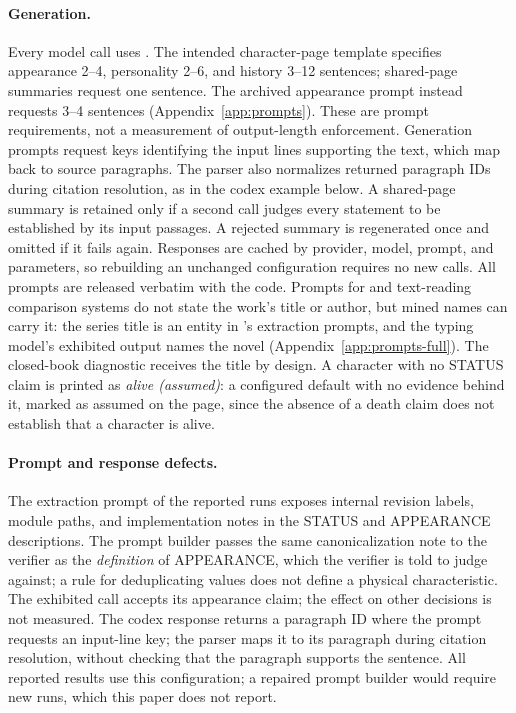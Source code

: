 \paragraph{Generation.} Every model call uses . The intended character-page
template specifies appearance 2--4, personality 2--6, and history 3--12 sentences; shared-page
summaries request one sentence. The archived \sys appearance prompt instead requests
3--4 sentences (Appendix~\ref{app:prompts}). These are prompt requirements, not a measurement
of output-length enforcement. Generation prompts request keys identifying the input lines
supporting the text, which map back to source paragraphs. The parser also normalizes returned
paragraph IDs during citation resolution, as in the codex example below. A shared-page
summary is retained only if a second call judges every statement to be established by its
input passages. A rejected summary is regenerated once and omitted if it fails again.
Responses are cached by provider, model, prompt, and parameters, so rebuilding an unchanged
configuration requires no new calls. All prompts are released verbatim with the code.
Prompts for \sys and text-reading comparison systems do not state the work's title or
author, but mined names can carry it: the series title is an entity in \sys's extraction
prompts, and the typing model's exhibited output names the novel (Appendix~\ref{app:prompts-full}).
The closed-book diagnostic receives the title by design.
A character with no STATUS claim is printed as \emph{alive (assumed)}: a configured
default with no evidence behind it, marked as assumed on the page, since the absence of a
death claim does not establish that a character is alive.

\paragraph{Prompt and response defects.} The extraction prompt of the reported runs
exposes internal revision labels, module paths, and implementation notes in the STATUS and
APPEARANCE descriptions. The prompt builder passes the same canonicalization note to the
verifier as the \emph{definition} of APPEARANCE, which the verifier is told to judge
against; a rule for deduplicating values does not define a physical characteristic. The
exhibited call accepts its appearance claim; the effect on other decisions is not measured.
The codex response returns a paragraph ID where the prompt requests an input-line key; the
parser maps it to its paragraph during citation resolution, without checking that the
paragraph supports the sentence. All reported results use this configuration; a repaired
prompt builder would require new runs, which this paper does not report.

